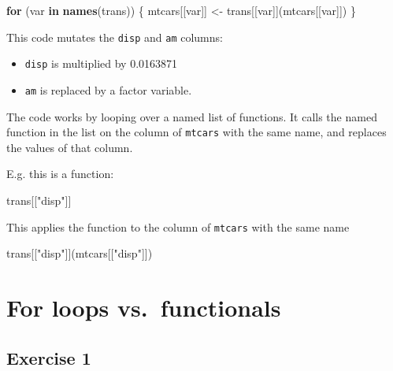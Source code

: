 \documentclass[]{book}
\newenvironment{Shaded}{\begin{snugshade}}{\end{snugshade}}
\newcommand{\ControlFlowTok}[1]{\textcolor[rgb]{0.13,0.29,0.53}{\textbf{#1}}}
\newcommand{\KeywordTok}[1]{\textcolor[rgb]{0.13,0.29,0.53}{\textbf{#1}}}
\newcommand{\NormalTok}[1]{#1}
\newcommand{\StringTok}[1]{\textcolor[rgb]{0.31,0.60,0.02}{#1}}
\providecommand{\tightlist}{%
  \setlength{\itemsep}{0pt}\setlength{\parskip}{0pt}}
\theoremstyle{plain}
\theoremstyle{remark}
\theoremstyle{definition}
\theoremstyle{definition}
\theoremstyle{definition}
\theoremstyle{remark}
\begin{document}
\begin{Shaded}
\begin{Highlighting}[]
\ControlFlowTok{for}\NormalTok{ (var }\ControlFlowTok{in} \KeywordTok{names}\NormalTok{(trans)) \{}
\NormalTok{  mtcars[[var]] <-}\StringTok{ }\NormalTok{trans[[var]](mtcars[[var]])}
\NormalTok{\}}
\end{Highlighting}
\end{Shaded}

This code mutates the \texttt{disp} and \texttt{am} columns:

\begin{itemize}
\tightlist
\item
  \texttt{disp} is multiplied by 0.0163871
\item
  \texttt{am} is replaced by a factor variable.
\end{itemize}

The code works by looping over a named list of functions. It calls the
named function in the list on the column of \texttt{mtcars} with the
same name, and replaces the values of that column.

E.g. this is a function:

\begin{Shaded}
\begin{Highlighting}[]
\NormalTok{trans[[}\StringTok{"disp"}\NormalTok{]]}
\end{Highlighting}
\end{Shaded}

This applies the function to the column of \texttt{mtcars} with the same
name

\begin{Shaded}
\begin{Highlighting}[]
\NormalTok{trans[[}\StringTok{"disp"}\NormalTok{]](mtcars[[}\StringTok{"disp"}\NormalTok{]])}
\end{Highlighting}
\end{Shaded}

\hypertarget{for-loops-vs.functionals}{%
\section{For loops vs.~functionals}\label{for-loops-vs.functionals}}

\hypertarget{exercise-1-59}{%
\subsection{Exercise 1}\label{exercise-1-59}}
\end{document}
